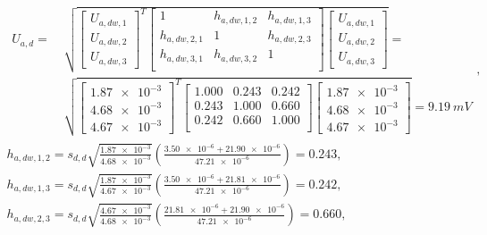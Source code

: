 \begin{gather}
\begin{split}
U_{a,d} = ~ & \sqrt{
\begin{bmatrix}
U_{a,dw,1} \\ U_{a,dw,2} \\ U_{a,dw,3}
\end{bmatrix}^{T}
\begin{bmatrix}
1            & h_{a,dw,1,2} & h_{a,dw,1,3} \\
h_{a,dw,2,1} & 1            & h_{a,dw,2,3} \\
h_{a,dw,3,1} & h_{a,dw,3,2} & 1                 \\
\end{bmatrix}
\begin{bmatrix}
U_{a,dw,1} \\ U_{a,dw,2} \\ U_{a,dw,3}
\end{bmatrix}} = ~ \\ & \sqrt{
\begin{bmatrix}
\num{1.87e-3} \\ \num{4.68e-3} \\ \num{4.67e-3}
\end{bmatrix}^{T}
\begin{bmatrix}
\num{1.000} & \num{0.243} & \num{0.242} \\
\num{0.243} & \num{1.000} & \num{0.660} \\
\num{0.242} & \num{0.660} & \num{1.000} \\
\end{bmatrix}
\begin{bmatrix}
\num{1.87e-3} \\ \num{4.68e-3} \\ \num{4.67e-3}
\end{bmatrix}} = \qty{9.19}{mV}
\end{split}
\label{eq:sym_parta_uncert_dyn}, \\
h_{a,dw,1,2} = s_{d,d} \sqrt{\frac{\num{1.87e-3}}{\num{4.68e-3}}} \left( \frac{\num{3.50e-6} + \num{21.90e-6}}{\num{47.21e-6}} \right) = \num{0.243} \label{eq:sym_parta_coher_dw_1_2}, \\
h_{a,dw,1,3} = s_{d,d} \sqrt{\frac{\num{1.87e-3}}{\num{4.67e-3}}} \left( \frac{\num{3.50e-6} + \num{21.81e-6}}{\num{47.21e-6}} \right) = \num{0.242} \label{eq:sym_parta_coher_dw_1_3}, \\
h_{a,dw,2,3} = s_{d,d} \sqrt{\frac{\num{4.67e-3}}{\num{4.68e-3}}} \left( \frac{\num{21.81e-6} + \num{21.90e-6}}{\num{47.21e-6}} \right) = \num{0.660} \label{eq:sym_parta_coher_dw_2_3}, \\

\end{gather}
